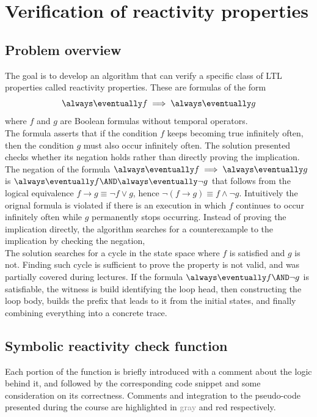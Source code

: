 \section*{Verification of reactivity properties}
\subsection*{Problem overview}
The goal is to develop an algorithm that can verify a specific class of LTL properties called reactivity properties. These are formulas of the form \[\always\eventually f \implies \always\eventually g\] where \(f\) and \(g\) are Boolean formulas without temporal operators.\\[2ex]
The formula asserts that if the condition \(f\) keeps becoming true infinitely often, then the condition \(g\) must also occur infinitely often. The solution presented checks whether its negation holds rather than directly proving the implication.\\[2ex]
The negation of the formula \(\always\eventually f \implies \always\eventually g\) is \(\always\eventually f \AND \always\eventually \neg g\) that follows from the logical equivalence \(f \rightarrow g \equiv \neg f \lor g\), hence \(\neg (f \rightarrow g) \equiv f \land \neg g\). Intuitively the orignal formula is violated if there is an execution in which \(f\) continues to occur infinitely often while \(g\) permanently stops occurring. Instead of proving the implication directly, the algorithm searches for a counterexample to the implication by checking the negation, \\[2ex]
The solution searches for a cycle in the state space where \(f\) is satisfied and \(g\) is not. Finding such cycle is sufficient to prove the property is not valid, and was partially covered during lectures. If the formula \(\always\eventually f \AND \lnot g\) is satisfiable, the witness is build identifying the loop head, then constructing the loop body, builds the prefix that leads to it from the initial states, and finally combining everything into a concrete trace.

\subsection*{Symbolic reactivity check function}
Each portion of the function is briefly introduced with a comment about the logic behind it, and followed by the corresponding code snippet and some consideration on its correctness. Comments and integration to the pseudo-code presented during the course are highlighted in \textcolor{Gray}{gray} and \textcolor{BrickRed}{red} respectively.

